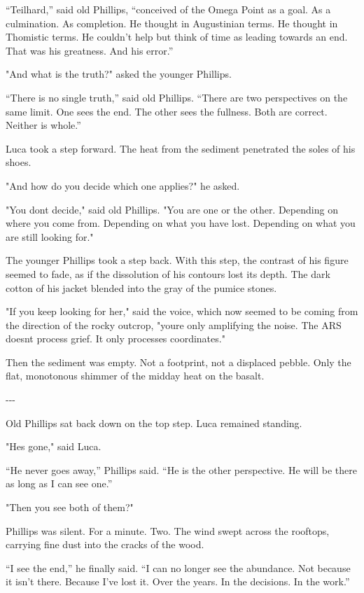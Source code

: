 \documentclass[
  ngerman,
]{article}
\begin{document}
``Teilhard,'' said old Phillips, ``conceived of the Omega Point as a
goal. As a culmination. As completion. He thought in Augustinian terms.
He thought in Thomistic terms. He couldn't help but think of time as
leading towards an end. That was his greatness. And his error.''

"And what is the truth?" asked the younger Phillips.

``There is no single truth,'' said old Phillips. ``There are two
perspectives on the same limit. One sees the end. The other sees the
fullness. Both are correct. Neither is whole.''

Luca took a step forward. The heat from the sediment penetrated the
soles of his shoes.

"And how do you decide which one applies?" he asked.

"You don\textquotesingle t decide," said old Phillips. "You are one or
the other. Depending on where you come from. Depending on what you have
lost. Depending on what you are still looking for."

The younger Phillips took a step back. With this step, the contrast of
his figure seemed to fade, as if the dissolution of his contours lost
its depth. The dark cotton of his jacket blended into the gray of the
pumice stones.

"If you keep looking for her," said the voice, which now seemed to be
coming from the direction of the rocky outcrop, "you\textquotesingle re
only amplifying the noise. The ARS doesn\textquotesingle t process
grief. It only processes coordinates."

Then the sediment was empty. Not a footprint, not a displaced pebble.
Only the flat, monotonous shimmer of the midday heat on the basalt.

-\/-\/-

Old Phillips sat back down on the top step. Luca remained standing.

"He\textquotesingle s gone," said Luca.

``He never goes away,'' Phillips said. ``He is the other perspective. He
will be there as long as I can see one.''

"Then you see both of them?"

Phillips was silent. For a minute. Two. The wind swept across the
rooftops, carrying fine dust into the cracks of the wood.

``I see the end,'' he finally said. ``I can no longer see the abundance.
Not because it isn't there. Because I've lost it. Over the years. In the
decisions. In the work.''
\end{document}
